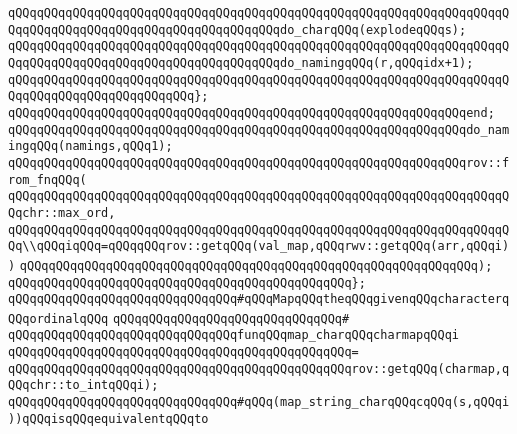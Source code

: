 \newline
\verb|qQQqqQQqqQQqqQQqqQQqqQQqqQQqqQQqqQQqqQQqqQQqqQQqqQQqqQQqqQQqqQQqqQQqqQQqqQQqqQQqqQQqqQQqqQQqqQQqqQQqqQQqqQQqdo_charqQQq(explodeqQQqs);|\newline
\verb|qQQqqQQqqQQqqQQqqQQqqQQqqQQqqQQqqQQqqQQqqQQqqQQqqQQqqQQqqQQqqQQqqQQqqQQqqQQqqQQqqQQqqQQqqQQqqQQqqQQqqQQqqQQqdo_namingqQQq(r,qQQqidx+1);|\newline
\verb|qQQqqQQqqQQqqQQqqQQqqQQqqQQqqQQqqQQqqQQqqQQqqQQqqQQqqQQqqQQqqQQqqQQqqQQqqQQqqQQqqQQqqQQqqQQqqQQq};|\newline
\verb|qQQqqQQqqQQqqQQqqQQqqQQqqQQqqQQqqQQqqQQqqQQqqQQqqQQqqQQqqQQqqQQqend;|\newline
\newline
\verb|qQQqqQQqqQQqqQQqqQQqqQQqqQQqqQQqqQQqqQQqqQQqqQQqqQQqqQQqqQQqqQQqdo_namingqQQq(namings,qQQq1);|\newline
\newline
\verb|qQQqqQQqqQQqqQQqqQQqqQQqqQQqqQQqqQQqqQQqqQQqqQQqqQQqqQQqqQQqqQQqrov::from_fnqQQq(|\newline
\verb|qQQqqQQqqQQqqQQqqQQqqQQqqQQqqQQqqQQqqQQqqQQqqQQqqQQqqQQqqQQqqQQqqQQqqQQqchr::max_ord,|\newline
\verb|qQQqqQQqqQQqqQQqqQQqqQQqqQQqqQQqqQQqqQQqqQQqqQQqqQQqqQQqqQQqqQQqqQQqqQQq\\qQQqiqQQq=qQQqqQQqrov::getqQQq(val_map,qQQqrwv::getqQQq(arr,qQQqi))|\newline
\verb|qQQqqQQqqQQqqQQqqQQqqQQqqQQqqQQqqQQqqQQqqQQqqQQqqQQqqQQqqQQqqQQq);|\newline
\verb|qQQqqQQqqQQqqQQqqQQqqQQqqQQqqQQqqQQqqQQqqQQqqQQq};|\newline
\newline
\newline
\verb|qQQqqQQqqQQqqQQqqQQqqQQqqQQqqQQq#qQQqMapqQQqtheqQQqgivenqQQqcharacterqQQqordinalqQQq|\newline
\verb|qQQqqQQqqQQqqQQqqQQqqQQqqQQqqQQq#|\newline
\verb|qQQqqQQqqQQqqQQqqQQqqQQqqQQqqQQqfunqQQqmap_charqQQqcharmapqQQqi|\newline
\verb|qQQqqQQqqQQqqQQqqQQqqQQqqQQqqQQqqQQqqQQqqQQqqQQq=|\newline
\verb|qQQqqQQqqQQqqQQqqQQqqQQqqQQqqQQqqQQqqQQqqQQqqQQqrov::getqQQq(charmap,qQQqchr::to_intqQQqi);|\newline
\newline
\newline
\verb|qQQqqQQqqQQqqQQqqQQqqQQqqQQqqQQq#qQQq(map_string_charqQQqcqQQq(s,qQQqi))qQQqisqQQqequivalentqQQqto|\newline
